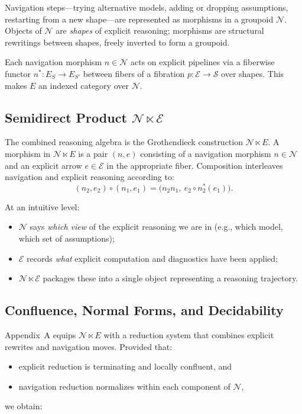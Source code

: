 \documentclass[11pt]{article}
\theoremstyle{definition}
\newcommand{\Ecat}{\mathcal{E}} %
\newcommand{\Ncat}{\mathcal{N}} %
\newcommand{\Scat}{\mathcal{S}} %
\begin{document}
Navigation steps---trying alternative models, adding or dropping
assumptions, restarting from a new shape---are represented as morphisms
in a groupoid \(\Ncat\). Objects of \(\Ncat\) are \emph{shapes} of
explicit reasoning; morphisms are structural rewritings between shapes,
freely inverted to form a groupoid.

Each navigation morphism \(n\in\Ncat\) acts on explicit pipelines
via a fiberwise functor \(n^\ast:E_S\to E_{S'}\) between fibers of a
fibration \(p:\Ecat\to\Scat\) over shapes. This makes \(E\) an indexed
category over \(\Ncat\).

\subsection{Semidirect Product \texorpdfstring{\(\Ncat \ltimes \Ecat\)}{N ⋉ E}}

The combined reasoning algebra is the Grothendieck construction
\(\Ncat \ltimes E\). A morphism in \(\Ncat \ltimes E\) is a pair
\((n,e)\) consisting of a navigation morphism \(n\in\Ncat\) and an
explicit arrow \(e\in\Ecat\) in the appropriate fiber. Composition
interleaves navigation and explicit reasoning according to:
\[
(n_2,e_2)\circ(n_1,e_1)
 =
\bigl(n_2n_1,\ e_2\circ n_2^\ast(e_1)\bigr).
\]

At an intuitive level:
\begin{itemize}[leftmargin=2em]
  \item \(\Ncat\) says \emph{which view} of the explicit reasoning we
        are in (e.g., which model, which set of assumptions);
  \item \(\Ecat\) records \emph{what} explicit computation and
        diagnostics have been applied;
  \item \(\Ncat \ltimes \Ecat\) packages these into a single object
        representing a reasoning trajectory.
\end{itemize}

\subsection{Confluence, Normal Forms, and Decidability}

Appendix~A equips \(\Ncat \ltimes E\) with a reduction system that
combines explicit rewrites and navigation moves. Provided that:
\begin{itemize}[leftmargin=2em]
  \item explicit reduction is terminating and locally confluent, and
  \item navigation reduction normalizes within each component of
        \(\Ncat\),
\end{itemize}
we obtain:
\end{document}
